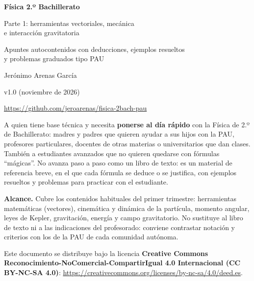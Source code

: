 \documentclass[11pt,a4paper]{article}
\newcommand{\autor}{Jerónimo Arenas García}
\newcommand{\repo}{https://github.com/jeroarenas/fisica-2bach-pau}
\newcommand{\version}{v1.0 (noviembre de 2026)}
\begin{document}
\begin{titlepage}
\centering
\vspace*{0.3cm}
{\huge\bfseries Física 2.º Bachillerato\par}
\vspace{0.4cm}
{\Large Parte 1: herramientas vectoriales, mecánica\\[2pt] e interacción gravitatoria\par}
\vspace{0.4cm}
{\normalsize Apuntes autocontenidos con deducciones, ejemplos resueltos\\ y problemas graduados tipo PAU\par}
\vspace{0.4cm}
{\large \autor\par}
\vspace{0.3cm}
{\normalsize \version\par}
\vspace{0.2cm}
{\small \url{\repo}\par}
\vspace{0.4cm}
\begin{tcolorbox}[colback=blue!4,colframe=blue!50!black,fonttitle=\bfseries,title={A quién va dirigido},halign=left,width=\textwidth]
\small
A quien tiene base técnica y necesita \textbf{ponerse al día rápido} con la Física de 2.º de Bachillerato: madres y padres que quieren ayudar a sus hijos con la PAU, profesores particulares, docentes de otras materias o universitarios que dan clases. También a estudiantes avanzados que no quieren quedarse con fórmulas ``mágicas''. No avanza paso a paso como un libro de texto: es un material de referencia breve, en el que cada fórmula se deduce o se justifica, con ejemplos resueltos y problemas para practicar con el estudiante.

\smallskip
\textbf{Alcance.} Cubre los contenidos habituales del primer trimestre: herramientas matemáticas (vectores), cinemática y dinámica de la partícula, momento angular, leyes de Kepler, gravitación, energía y campo gravitatorio. No sustituye al libro de texto ni a las indicaciones del profesorado: conviene contrastar notación y criterios con los de la PAU de cada comunidad autónoma.
\end{tcolorbox}

\begin{tcolorbox}[colback=gray!4,colframe=gray!60!black,fonttitle=\bfseries,title={Licencia},halign=left,width=\textwidth]
\small
Este documento se distribuye bajo la licencia \textbf{Creative Commons Reconocimiento-NoComercial-CompartirIgual 4.0 Internacional (CC BY-NC-SA 4.0)}: \url{https://creativecommons.org/licenses/by-nc-sa/4.0/deed.es}.


\end{tcolorbox}
\end{titlepage}
\end{document}
